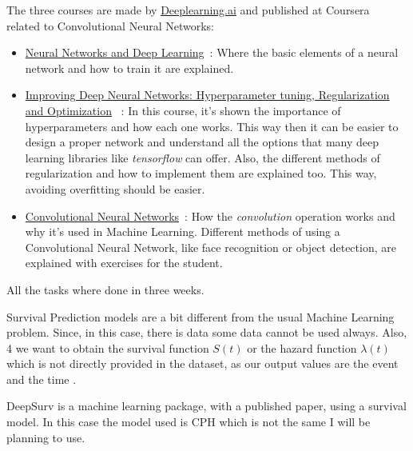 The three courses are made by \href{https://www.deeplearning.ai}{Deeplearning.ai}
and published at Coursera~\cite{neural:coursera} related to Convolutional Neural Networks:
\begin{itemize}
  \item \href{https://www.coursera.org/learn/neural-networks-deep-learning}{Neural Networks and 
    Deep Learning}~\cite{neural:coursera:nn}: Where the basic elements of a neural network and how
    to train it are explained.

  \item \href{https://www.coursera.org/learn/deep-neural-network}{Improving Deep Neural Networks: 
    Hyperparameter tuning, Regularization and Optimization}
    ~\cite{neural:coursera:nn-hyperparameters}: 
    In this course, it's shown the importance of hyperparameters and how each one works. 
    This way then it can be easier to design a proper network and understand all the options that
    many deep learning libraries like \emph{tensorflow} can offer. Also, the different methods 
    of regularization and how to implement them are explained too. This way, avoiding overfitting
    should be easier.

  \item \href{https://www.coursera.org/learn/convolutional-neural-networks}{Convolutional Neural 
    Networks}~\cite{neural:coursera:cnn}:
    How the \emph{convolution} operation works and why it's used in Machine Learning. 
    Different methods of using a Convolutional Neural Network, like face recognition or 
    object detection, are explained with exercises for the student.
\end{itemize}

All the tasks where done in three weeks.


Survival Prediction models are a bit different from the usual Machine Learning problem. Since, 
in this case, there is  data some data cannot be used always. Also, 4
we want to obtain the survival function \( S(t) \) or the hazard function \( \lambda(t) \) 
which is not directly provided in the dataset, as our output values are the \gls{event} 
 and the \gls{time} .

DeepSurv is a machine learning package, with a published paper, using a survival model. In this
case the model used is \gls{CPH} which is not the same I will be planning to use.

